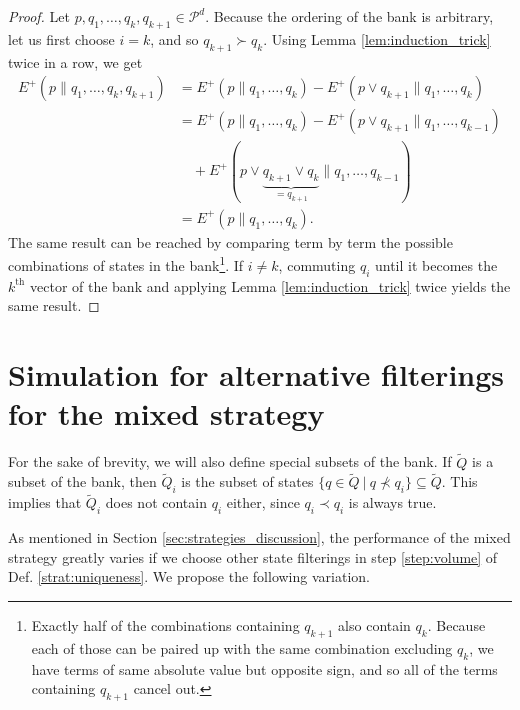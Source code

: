 \begin{proof}
    Let $p, q_1, \dots, q_k, q_{k+1} \in \mathcal{P}^d$.  Because the ordering of the bank is arbitrary, let us first choose $i = k$, and so $q_{k+1} \succ q_k$. Using Lemma \ref{lem:induction_trick} twice in a row, we get
    \begin{align}
        E^+(p \parallel q_1, \dots, q_k, q_{k+1}) &= E^+(p \parallel q_1, \dots, q_k) - E^+(p \vee q_{k+1} \parallel q_1, \dots, q_k)\\
                                                  &= E^+(p \parallel q_1, \dots, q_k) - E^+(p \vee q_{k+1} \parallel q_1, \dots, q_{k-1})\nonumber\\
                                                  &\quad + E^+(p \vee \underbrace{q_{k+1} \vee q_k}_{= q_{k+1}} \parallel q_1, \dots, q_{k-1})\\
                                                  &= E^+(p \parallel q_1, \dots, q_k).
    \end{align}
    The same result can be reached by comparing term by term the possible combinations of states in the bank\footnote{Exactly half of the combinations containing $q_{k+1}$ also contain $q_k$. Because each of those can be paired up with the same combination excluding $q_k$, we have terms of same absolute value but opposite sign, and so all of the terms containing $q_{k+1}$ cancel out.}. If $i \neq k$, commuting $q_i$ until it becomes the $k^\text{th}$ vector of the bank and applying Lemma \ref{lem:induction_trick} twice yields the same result. 
\end{proof}



\newpage

\section{Simulation for alternative filterings for the mixed strategy} \label{app:alternative_filterings}

\setcounter{equation}{0}

For the sake of brevity, we will also define special subsets of the bank. If $\tilde{Q}$ is a subset of the bank, then $\tilde{Q}_i$ is the subset of states $\{q \in \tilde{Q} \: | \: q \nprec q_i\} \subseteq \tilde{Q}$. This implies that $\tilde{Q}_i$ does not contain $q_i$ either, since $q_i \prec q_i$ is always true.

As mentioned in Section \ref{sec:strategies_discussion}, the performance of the mixed strategy greatly varies if we choose other state filterings in step \ref{step:volume} of Def. \ref{strat:uniqueness}. We propose the following variation.

